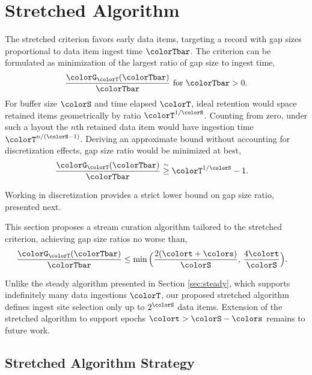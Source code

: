 \section{Stretched Algorithm} \label{sec:stretched}

The stretched criterion favors early data items, targeting a record with gap sizes proportional to data item ingest time $\colorTbar$.
The criterion can be formulated as minimization of the largest ratio of gap size to ingest time,
\begin{align*}
\frac{\colorG_{\colorT}(\colorTbar)}{\colorTbar} \text{ for } \colorTbar > 0.
\end{align*}
For buffer size $\colorS$ and time elapsed $\colorT$, ideal retention would space retained items geometrically by ratio $\colorT^{1/\colorS}$.
Counting from zero, under such a layout the $n$th retained data item would have ingestion time $\colorT^{n/(\colorS - 1)}$.
Deriving an approximate bound without accounting for discretization effects, gap size ratio would be minimized at best,
\begin{align}
\label{eqn:approx-gap-bound}
\frac{\colorG_{\colorT}(\colorTbar)}{\colorTbar}
&\stackrel{\sim}{\geq}
\colorT^{1/\colorS} - 1.
\end{align}

Working in discretization provides a strict lower bound on gap size ratio, presented next.



This section proposes a stream curation algorithm tailored to the stretched criterion, achieving gap size ratios no worse than,
\begin{align*}
\frac{\colorG_{\colorT}(\colorTbar)}{\colorTbar}
&\leq
\min\Big(
  \frac{2(\colort + \colors)}{\colorS},\,
  \frac{4\colort}{\colorS}
\Big).
\end{align*}

Unlike the steady algorithm presented in Section \ref{sec:steady}, which supports indefinitely many data ingestions $\colorT$, our proposed stretched algorithm defines ingest site selection only up to $2^{\colorS}$ data items.
Extension of the stretched algorithm to support epochs $\colort > \colorS - \colors$ remains to future work.

\subsection{Stretched Algorithm Strategy}
\label{sec:stretched-strategy}

